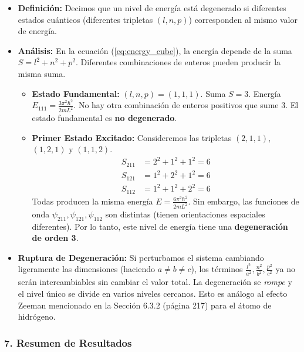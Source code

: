\documentclass[a4paper]{article}
\begin{document}
\begin{itemize}
    \item \textbf{Definición:} Decimos que un nivel de energía está degenerado si diferentes estados cuánticos (diferentes tripletas $(l, n, p)$) corresponden al mismo valor de energía.
    
    \item \textbf{Análisis:} En la ecuación (\ref{eq:energy_cube}), la energía depende de la suma $S = l^2 + n^2 + p^2$. Diferentes combinaciones de enteros pueden producir la misma suma.
    \begin{itemize}
        \item \textbf{Estado Fundamental:} $(l, n, p) = (1, 1, 1)$. Suma $S = 3$. Energía $E_{111} = \frac{3\pi^2 \hbar^2}{2mL^2}$. No hay otra combinación de enteros positivos que sume 3. El estado fundamental es \textbf{no degenerado}.
        
        \item \textbf{Primer Estado Excitado:} Consideremos las tripletas $(2, 1, 1)$, $(1, 2, 1)$ y $(1, 1, 2)$.
        \begin{align}
        S_{211} &= 2^2 + 1^2 + 1^2 = 6 \\
        S_{121} &= 1^2 + 2^2 + 1^2 = 6 \\
        S_{112} &= 1^2 + 1^2 + 2^2 = 6
        \end{align}
        Todas producen la misma energía $E = \frac{6\pi^2 \hbar^2}{2mL^2}$. Sin embargo, las funciones de onda $\psi_{211}, \psi_{121}, \psi_{112}$ son distintas (tienen orientaciones espaciales diferentes). Por lo tanto, este nivel de energía tiene una \textbf{degeneración de orden 3}.
    \end{itemize}
    
    \item \textbf{Ruptura de Degeneración:} Si perturbamos el sistema cambiando ligeramente las dimensiones (haciendo $a \neq b \neq c$), los términos $\frac{l^2}{a^2}, \frac{n^2}{b^2}, \frac{p^2}{c^2}$ ya no serán intercambiables sin cambiar el valor total. La degeneración se \textit{rompe} y el nivel único se divide en varios niveles cercanos. Esto es análogo al efecto Zeeman mencionado en la Sección 6.3.2 (página 217) para el átomo de hidrógeno.
\end{itemize}

\subsubsection{7. Resumen de Resultados}
\end{document}

